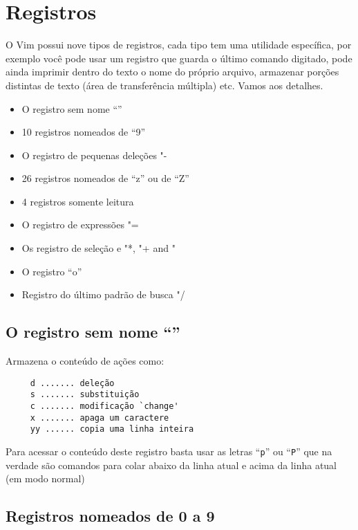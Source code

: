 
\chapter{Registros}
\label{Registros}

O Vim possui nove tipos de registros, cada tipo tem uma utilidade específica,
por exemplo você pode usar um registro que guarda o último comando digitado,
pode ainda imprimir dentro do texto o nome do próprio arquivo, armazenar
porções distintas de texto (área de transferência múltipla) etc. Vamos aos
detalhes.

\begin{itemize}
   \item O registro sem nome ``''
   \item 10 registros nomeados de ``9''
   \item O registro de pequenas deleções "-
   \item 26 registros nomeados de ``z'' ou de ``Z''
   \item 4 registros somente leitura
   \item O registro de expressões "=
   \item Os registro de seleção e  "*, "+ and "~
   \item O registro ``o''
   \item Registro do último padrão de busca "/
\end{itemize}

\section{O registro sem nome ``''}
\label{O registro sem nome ``''}

Armazena o conteúdo de ações como:

\begin{verbatim}
     d ....... deleção
     s ....... substituição
     c ....... modificação `change'
     x ....... apaga um caractere
     yy ...... copia uma linha inteira
\end{verbatim}

Para acessar o conteúdo deste registro basta usar as letras ``{\tt p}'' ou ``{\tt P}'' que
na verdade são comandos para colar abaixo da linha atual e acima da
linha atual (em modo normal)

\section{Registros nomeados de 0 a 9}
\label{Registros nomeados de 0 a 9}

